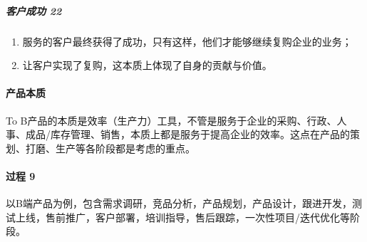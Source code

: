 \documentclass[letterpaper,10pt,english]{sphinxmanual}
\begin{document}
\subparagraph{客户成功 22\sphinxfootnotemark[74]}
\label{\detokenize{chapter_introduction/2B:id3}}%
\begin{footnotetext}[74]\sphinxAtStartFootnote
{}
%
\end{footnotetext}\ignorespaces \begin{enumerate}
%
\item {} 
服务的客户最终获得了成功，只有这样，他们才能够继续复购企业的业务；

\item {} 
让客户实现了复购，这本质上体现了自身的贡献与价值。

\end{enumerate}


\paragraph{产品本质}
\label{\detokenize{chapter_introduction/2B:id4}}
To
B产品的本质是效率（生产力）工具，不管是服务于企业的采购、行政、人事、成品/库存管理、销售，本质上都是服务于提高企业的效率。这点在产品的策划、打磨、生产等各阶段都是考虑的重点。


\paragraph{过程 9\sphinxfootnotemark[75]}
\label{\detokenize{chapter_introduction/2B:id5}}%
\begin{footnotetext}[75]\sphinxAtStartFootnote
{}
%
\end{footnotetext}\ignorespaces 
以B端产品为例，包含需求调研，竞品分析，产品规划，产品设计，跟进开发，测试上线，售前推广，客户部署，培训指导，售后跟踪，一次性项目/迭代优化等阶段。
\end{document}
